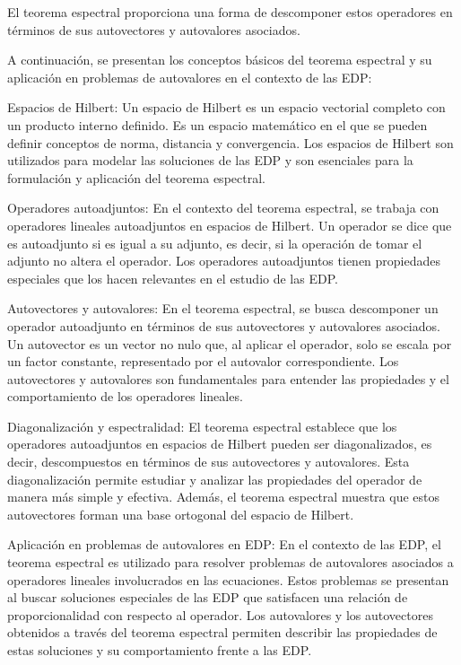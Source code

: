 \documentclass{article}
\begin{document}
    El teorema espectral proporciona una forma de descomponer estos operadores en términos de sus autovectores y autovalores asociados.

    A continuación, se presentan los conceptos básicos del teorema espectral y su aplicación en problemas de autovalores en el contexto de las EDP:

    Espacios de Hilbert: Un espacio de Hilbert es un espacio vectorial completo con un producto interno definido. Es un espacio matemático en el que se pueden definir conceptos de norma, distancia y convergencia. Los espacios de Hilbert son utilizados para modelar las soluciones de las EDP y son esenciales para la formulación y aplicación del teorema espectral.

    Operadores autoadjuntos: En el contexto del teorema espectral, se trabaja con operadores lineales autoadjuntos en espacios de Hilbert. Un operador se dice que es autoadjunto si es igual a su adjunto, es decir, si la operación de tomar el adjunto no altera el operador. Los operadores autoadjuntos tienen propiedades especiales que los hacen relevantes en el estudio de las EDP.

    Autovectores y autovalores: En el teorema espectral, se busca descomponer un operador autoadjunto en términos de sus autovectores y autovalores asociados. Un autovector es un vector no nulo que, al aplicar el operador, solo se escala por un factor constante, representado por el autovalor correspondiente. Los autovectores y autovalores son fundamentales para entender las propiedades y el comportamiento de los operadores lineales.

    Diagonalización y espectralidad: El teorema espectral establece que los operadores autoadjuntos en espacios de Hilbert pueden ser diagonalizados, es decir, descompuestos en términos de sus autovectores y autovalores. Esta diagonalización permite estudiar y analizar las propiedades del operador de manera más simple y efectiva. Además, el teorema espectral muestra que estos autovectores forman una base ortogonal del espacio de Hilbert.

    Aplicación en problemas de autovalores en EDP: En el contexto de las EDP, el teorema espectral es utilizado para resolver problemas de autovalores asociados a operadores lineales involucrados en las ecuaciones. Estos problemas se presentan al buscar soluciones especiales de las EDP que satisfacen una relación de proporcionalidad con respecto al operador. Los autovalores y los autovectores obtenidos a través del teorema espectral permiten describir las propiedades de estas soluciones y su comportamiento frente a las EDP.
\end{document}
